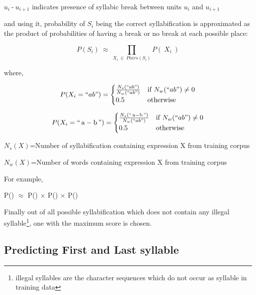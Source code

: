 \documentclass[runningheads,a4paper]{llncs}
\DeclareMathOperator{\adashb}{a-b}
\DeclareMathOperator{\dash}{-}
\begin{document}
\begin{small}
$u_{i} \dash u_{i+1}$ indicates presence of syllabic break between units $u_i$ and $u_{i+1}$
\end{small}

and using it, probability of $S_i$ being the correct syllabification is approximated as the product of probabilities of having a break or no break at each possible place:

\begin{equation}
P(S_i)\ \approx\ \prod\limits_{X_i\ \in\ Pairs(S_i)} P(\ X_i\ )
\end{equation}

where,

\begin{equation}
P(X_i=``ab")=
\begin{cases}
\frac{N_s(``ab")}{N_w(``ab")} & \mbox{if } N_w(``ab") \neq 0\\
0.5              & \mbox{otherwise}
\end{cases}
\end{equation}

\begin{equation}
P(X_i=``\adashb")=
\begin{cases}
\frac{N_s(``\adashb")}{N_w(``ab")} & \mbox{if } N_w(``ab") \neq 0\\
0.5              & \mbox{otherwise}
\end{cases}
\end{equation}

\begin{small}
$N_s(X)$=Number of syllabification containing expression X from training corpus
\end{small}


\begin{small}
$N_w(X)$=Number of words containing expression X from training corpus
\end{small}

\noindent For example,

\begin{center}
\noindent P({}) $\approx$ P({}) $\times$ P({}) $\times$ P({})
\end{center}

Finally out of all possible syllabification which does not contain any illegal syllable\footnote{illegal syllables are the character sequences which do not occur as syllable in training data}, one with the maximum score is chosen.


\subsection{Predicting First and Last syllable}
\label{subsection:predicting_first_and_last_syllable}
\end{document}
